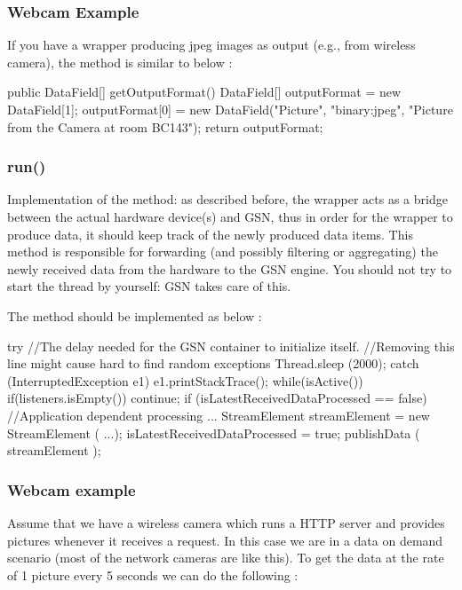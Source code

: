 \subsubsection {Webcam Example}
If you have a wrapper producing jpeg images as output (e.g., from wireless
camera), the method is similar to below :

\begin{javacode}
	public DataField[] getOutputFormat() {
		DataField[] outputFormat = new DataField[1];
		outputFormat[0] = new DataField("Picture", "binary:jpeg",
			"Picture from the Camera at room BC143");
		return outputFormat;
	}
\end{javacode}

\subsubsection{run()}
Implementation of the  method: as described before, the wrapper acts as
a bridge between the actual hardware device(s) and GSN, thus in order for the
wrapper to produce data, it should keep track of the newly produced data items.
This method is responsible for forwarding (and possibly filtering or aggregating)
the newly received data from the hardware to the GSN engine.
You should not try to start the thread by yourself: GSN takes care of this.

The method should be implemented as below :
\begin{javacode}
	try {
		//The delay needed for the GSN container to initialize itself.
		//Removing this line might cause hard to find random exceptions
		Thread.sleep (2000);
		} catch (InterruptedException e1) {
			e1.printStackTrace();
		}
		while(isActive()) {
			if(listeners.isEmpty())
				continue;
			if (isLatestReceivedDataProcessed == false) {
				//Application dependent processing ...
				StreamElement streamElement = new StreamElement ( ...);
				isLatestReceivedDataProcessed = true;
				publishData ( streamElement );
		}
	}
\end{javacode}

\subsubsection{Webcam example}
Assume that we have a wireless camera which runs a HTTP server and provides
pictures whenever it receives a  request. In this case we are in a data on
demand scenario (most of the network cameras are like this). To get the data
at the rate of 1 picture every 5 seconds we can do the following :


